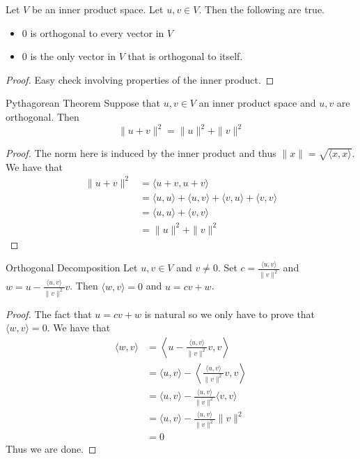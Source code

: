 \begin{crl}{}{} Let $V$ be an inner product space. Let $u,v\in V$. Then the following are true. 
\begin{itemize}
\item $0$ is orthogonal to every vector in $V$
\item $0$ is the only vector in $V$ that is orthogonal to itself. 
\end{itemize} \tcbline
\begin{proof}
Easy check involving properties of the inner product. 
\end{proof}
\end{crl}

\begin{thm}{Pythagorean Theorem}{} Suppose that $u,v\in V$ an inner product space and $u,v$ are orthogonal. Then $$\|u+v\|^2=\|u\|^2+\|v\|^2$$ \tcbline
\begin{proof}
The norm here is induced by the inner product and thus $\|x\|=\sqrt{\langle x,x\rangle}$. We have that 
\begin{align*}
\|u+v\|^2&=\langle u+v,u+v\rangle\\
&=\langle u,u\rangle+\langle u,v\rangle+\langle v,u\rangle+\langle v,v\rangle\\
&=\langle u,u\rangle+\langle v,v\rangle\\
&=\|u\|^2+\|v\|^2
\end{align*}
\end{proof}
\end{thm}

\begin{thm}{Orthogonal Decomposition}{} Let $u,v\in V$ and $v\neq 0$. Set $c=\frac{\langle u,v\rangle}{\|v\|^2}$ and $w=u-\frac{\langle u,v\rangle}{\|v\|^2}v$. Then $\langle w,v\rangle=0$ and $u=cv+w$. \tcbline
\begin{proof}
The fact that $u=cv+w$ is natural so we only have to prove that $\langle w,v\rangle=0$. We have that 
\begin{align*}
\langle w,v\rangle&=\left\langle u-\frac{\langle u,v\rangle}{\|v\|^2}v,v\right\rangle\\
&=\langle u,v\rangle-\left\langle \frac{\langle u,v\rangle}{\|v\|^2}v,v\right\rangle\\
&=\langle u,v\rangle-\frac{\langle u,v\rangle}{\|v\|^2}\langle v,v\rangle\\
&=\langle u,v\rangle-\frac{\langle u,v\rangle}{\|v\|^2}\|v\|^2\\
&=0
\end{align*}
Thus we are done. 
\end{proof}
\end{thm}

